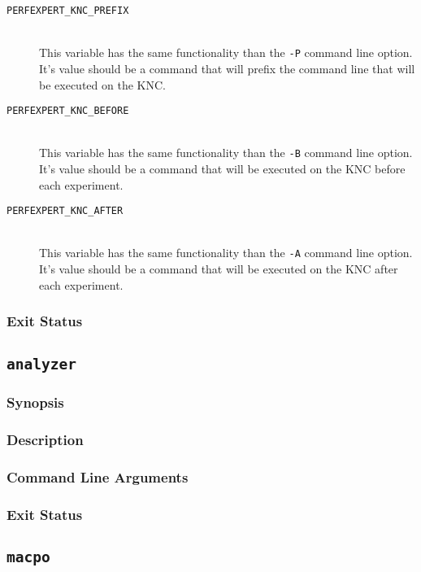 \begin{description}
	\item[\texttt{PERFEXPERT\_KNC\_PREFIX}]\hfill \\
	This variable has the same functionality than the \texttt{-P} command line option. It's value should be a command that will prefix the command line that will be executed on the KNC.

	\item[\texttt{PERFEXPERT\_KNC\_BEFORE}]\hfill \\
	This variable has the same functionality than the \texttt{-B} command line option. It's value should be a command that will be executed on the KNC before each experiment.

	\item[\texttt{PERFEXPERT\_KNC\_AFTER}]\hfill \\
	This variable has the same functionality than the \texttt{-A} command line option. It's value should be a command that will be executed on the KNC after each experiment.

\end{description}

\subsubsection{Exit Status}

\subsection{\texttt{analyzer}}

\subsubsection{Synopsis}

\subsubsection{Description}

\subsubsection{Command Line Arguments}

\subsubsection{Exit Status}

\subsection{\texttt{macpo}}


